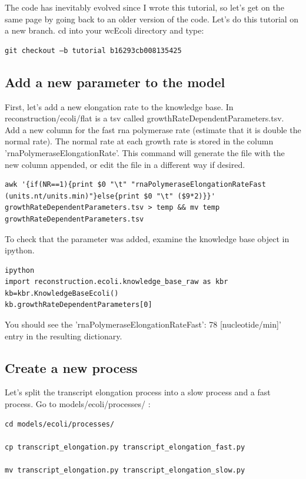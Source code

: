 \documentclass[12pt]{article}
\begin{document}
The code has inevitably evolved since I wrote this tutorial, so let’s get on the same page by going back to an older version of the code. Let’s do this tutorial on a new branch. cd into your wcEcoli directory and type:

\lstset{language=bash}
\begin{lstlisting}
git checkout –b tutorial b16293cb008135425
\end{lstlisting}


\subsection{Add a new parameter to the model}

First, let’s add a new elongation rate to the knowledge base. In reconstruction/ecoli/flat is a tsv called growthRateDependentParameters.tsv. Add a new column for the fast rna polymerase rate (estimate that it is double the normal rate). The normal rate at each growth rate is stored in the column 'rnaPolymeraseElongationRate'. This command will generate the file with the new column appended, or edit the file in a different way if desired.

\begin{lstlisting}
awk '{if(NR==1){print $0 "\t" "rnaPolymeraseElongationRateFast (units.nt/units.min)"}else{print $0 "\t" ($9*2)}}' growthRateDependentParameters.tsv > temp && mv temp growthRateDependentParameters.tsv  
\end{lstlisting}

To check that the parameter was added, examine the knowledge base object in ipython.

\lstset{language=Python}
\begin{lstlisting}
ipython
import reconstruction.ecoli.knowledge_base_raw as kbr
kb=kbr.KnowledgeBaseEcoli()
kb.growthRateDependentParameters[0]
\end{lstlisting}

You should see the 'rnaPolymeraseElongationRateFast': 78 [nucleotide/min]' entry in the resulting dictionary.

\subsection{Create a new process}

Let’s split the transcript elongation process into a slow process and a fast process. Go to models/ecoli/processes/ :

\lstset{language=bash}
\begin{lstlisting}
cd models/ecoli/processes/

cp transcript_elongation.py transcript_elongation_fast.py

mv transcript_elongation.py transcript_elongation_slow.py
\end{lstlisting}
\end{document}
